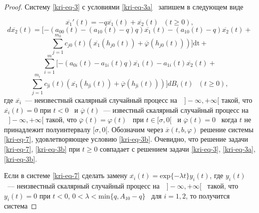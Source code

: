 \begin{proof}
Систему \eqref{kri-eq-3} с условиями \eqref{kri-eq-3a} \ запишем в следующем виде

\begin{equation*}
	\overline{x_1}'(t)=-q\overline{x_1}(t)+\overline{x_2}(t)\text{   }(t\ge 0),
\end{equation*}
\begin{equation*}
	d\overline{x_2}(t)=[-(a_{00}(t)-(a_{10}(t)-q)q)\overline{x_1}(t)-(a_{10}(t)-q)\overline{x_2}(t)+
\end{equation*}
\begin{equation}\label{kri-eq-7}
	\overset{m_0}{\underset{j=1}{\sum }}c_{\mathit{j0}}(t)(\overline{x_1}(h_{\mathit{j0}}(t))+\overline{\varphi
	}(h_{\mathit{j0}}(t)))]\text{dt}+
\end{equation}
\begin{equation*}
	\overset m{\underset{i=1}{\sum
	}}[-(a_{0i}(t)-a_{1i}(t)q)\overline{x_1}(t)-a_{1i}(t)\overline{x_2}(t)+
\end{equation*}
\begin{equation*}
	\overset{m_i}{\underset{j=1}{\sum
	}}c_{\text{ji}}(t)(\overline{x_1}(h_{\text{ji}}(t))+\overline{\varphi
	}(h_{\text{ji}}(t)))]\mathit{dB}_i(t)\text{  }(t\ge 0),
\end{equation*}
где  $\overline{x_i}$\ --- неизвестный скалярный случайный процесс на
$\text{  }]-\infty ,+\infty [$ такой, что  $\overline{x_i}(t)=0$ при
$t<0$ \ и  $\overline{\varphi }(t)$\ --- известный скалярный случайный процесс на $\text{  }]-\infty ,+\infty
[$ такой, что  $\overline{\varphi }(t)=\varphi (t)$ \ при  $t\in [\sigma ,0[$ \ и  $\overline{\varphi
}(t)=0$ \ когда  $t$ не принадлежит полуинтервалу  $[\sigma ,0[$. Обозначим через
$\overline x(t,b,\varphi )$ решение системы \eqref{kri-eq-7}, удовлетворяющее условию \eqref{kri-eq-3b}. 
Очевидно, что решение задачи \eqref{kri-eq-7}, \eqref{kri-eq-3b} при  $t\ge 0$ совпадает с решением задачи \eqref{kri-eq-3}, \eqref{kri-eq-3a}, \eqref{kri-eq-3b}.

Если в системе \eqref{kri-eq-7} сделать замену  $\overline{x_i}(t)=\text{exp}\{-\mathit{\lambda t}\}y_i(t)$, где  $y_i(t)$\ ---
неизвестный скалярный случайный процесс на  $\text{  }]-\infty ,+\infty [$ \ такой, что $y_i(t)=0$ при  $t<0$,
$0<\lambda <\text{min}\{q,A_{10}-q\}$ \ для  $i=1,2$, то получится система


\end{proof}
